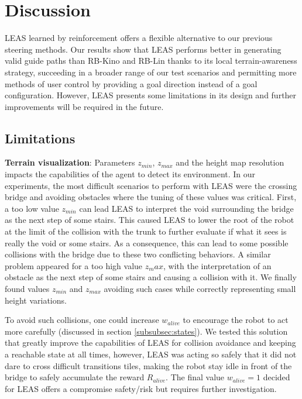 \section{Discussion\label{sub:leas:discussion}}
LEAS learned by reinforcement offers a flexible alternative to our previous steering methods. Our results show that LEAS performs better in generating valid guide paths than RB-Kino and RB-Lin thanks to its local terrain-awareness strategy, succeeding in a broader range of our test scenarios and permitting more methods of user control by providing a goal direction instead of a goal configuration. However, LEAS presents some limitations in its design and further improvements will be required in the future.

\subsection{Limitations}
\textbf{Terrain visualization}: 
Parameters $z_{min}$, $z_{max}$ and the height map resolution impacts the capabilities of the agent to detect its environment.
In our experiments, the most difficult scenarios to perform with LEAS were the crossing bridge and avoiding obstacles where the tuning of these values was critical.
First, a too low value $z_{min}$ can lead LEAS to interpret the void surrounding the bridge as the next step of some stairs. 
This caused LEAS to lower the root of the robot at the limit of the collision with the trunk to further evaluate if what it sees is really the void or some stairs. 
As a consequence, this can lead to some possible collisions with the bridge due to these two conflicting behaviors.
A similar problem appeared for a too high value $z_max$, with the interpretation of an obstacle as the next step of some stairs and causing a collision with it.
We finally found values $z_{min}$ and $z_{max}$ avoiding such cases while correctly representing small height variations.

To avoid such collisions, one could increase $w_{alive}$ to encourage the robot to act more carefully (discussed in section \ref{subsubsec:states}). 
We tested this solution that greatly improve the capabilities of LEAS for collision avoidance and keeping a reachable state at all times, however, LEAS was acting so safely that it did not dare to cross difficult transitions tiles, making the robot stay idle in front of the bridge to safely accumulate the reward $R_{alive}$. 
The final value $w_{alive}=1$ decided for LEAS offers a compromise safety/risk but requires further investigation. 

